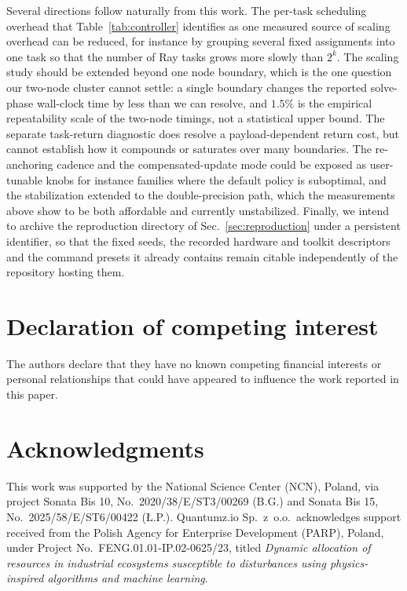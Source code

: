\documentclass[preprint,12pt,a4paper]{elsarticle}
\begin{document}
Several directions follow naturally from this work. The per-task scheduling overhead that
Table~\ref{tab:controller} identifies as one measured source of scaling overhead can be
reduced, for instance by grouping several fixed assignments into one task so that the number
of Ray tasks grows more slowly than $2^{k}$. The scaling study should be extended beyond one
node boundary, which is the one question our two-node cluster cannot settle: a single boundary
changes the reported solve-phase wall-clock time by less than we can resolve, and $1.5\%$ is
the empirical repeatability scale of the two-node timings, not a statistical upper bound. The
separate task-return diagnostic does resolve a payload-dependent return cost, but cannot
establish how it compounds or saturates over many boundaries. The re-anchoring cadence and the
compensated-update mode could be exposed as user-tunable knobs for instance families where the
default policy is suboptimal, and the stabilization extended to the double-precision path,
which the measurements above show to be both affordable and currently unstabilized. Finally,
we intend to archive the reproduction directory of
Sec.~\ref{sec:reproduction} under a persistent identifier, so that the fixed
seeds, the recorded hardware and toolkit descriptors and the command presets it
already contains remain citable independently of the repository hosting them.

\section*{Declaration of competing interest}
The authors declare that they have no known competing financial interests or
personal relationships that could have appeared to influence the work reported
in this paper.

\section*{Acknowledgments}
This work was supported by the National Science Center (NCN), Poland, via
project Sonata Bis 10, No.~2020/38/E/ST3/00269 (B.G.) and Sonata Bis 15,
No.~2025/58/E/ST6/00422 ({\L}.P.). Quantumz.io Sp.~z~o.o.\ acknowledges
support received from the Polish Agency for Enterprise Development (PARP),
Poland, under Project No.~FENG.01.01-IP.02-0625/23, titled
\textit{Dynamic allocation of resources in industrial ecosystems susceptible
to disturbances using physics-inspired algorithms and machine learning}.



\end{document}
